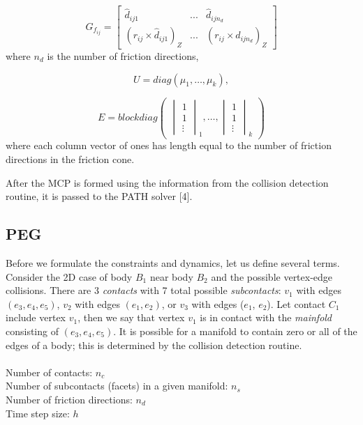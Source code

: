 \documentclass{article}
\begin{document}
\begin{equation}
G_{f_{ij}} = \begin{bmatrix} 
\hat{d}_{ij1} & ... & \hat{d}_{ijn_d} \\
(r_{ij} \times  \hat{d}_{ij1})_Z  & ... & (r_{ij} \times  \hat{d}_{ijn_d})_Z
\end{bmatrix}
\nonumber
 \end{equation}
where $n_d$ is the number of friction directions,   

\begin{equation}
U = diag(\mu_{1}, \ldots, \mu_{k}  ),  \nonumber
 \end{equation}

\begin{equation}
E = blockdiag
    \begin{pmatrix}
	\begin{vmatrix} 1 \\ 1 \\ \vdots \end{vmatrix}_1 , \ldots , 
	\begin{vmatrix} 1 \\ 1 \\ \vdots \end{vmatrix}_k  \nonumber 
    \end{pmatrix}
\end{equation}
where each column vector of ones has length equal to the number of friction directions in the friction cone.

After the MCP is formed using the information from the collision detection routine, it is passed to the PATH solver [4].  


\subsection{PEG}
Before we formulate the constraints and dynamics, let us define several terms.  Consider the 2D case of body $B_1$ near body $B_2$ and the possible vertex-edge collisions.  There are 3 \emph{contacts} with 7 total possible \emph{subcontacts}: $v_1$ with edges $(e_3, e_4, e_5)$, $v_2$ with edges $(e_1, e_2)$, or $v_3$ with edges ($e_1$, $e_2$).  Let contact $C_1$ include vertex $v_1$, then we say that vertex $v_1$ is in contact with the \emph{mainfold} consisting of $(e_3, e_4, e_5)$.  It is possible for a manifold to contain zero or all of the edges of a body; this is determined by the collision detection routine.  \\ \\
Number of contacts: $n_c$  \\
Number of subcontacts (facets) in a given manifold: $n_s$  \\
Number of friction directions: $n_d$  \\
Time step size: $h$ 
\end{document}
